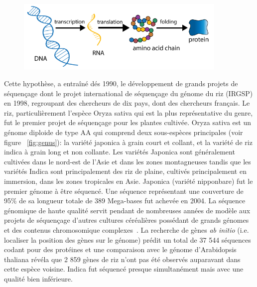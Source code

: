 \begin{figure}[!ht]
    \centering
    \includegraphics[width=0.90\textwidth]{hdr_manuscript/Figures/central-dogma.png}
    \label{fig:dogma}
\end{figure}



Cette hypothèse, a entraîné dés 1990, le développement de grands projets de séquençage dont le projet international de séquençage du génome du riz (IRGSP) en 1998, regroupant des chercheurs de dix pays, dont des chercheurs français. Le riz, particulièrement l'espèce Oryza sativa qui est la plus représentative du genre, fut le premier projet de séquençage pour les plantes cultivée. Oryza sativa est un génome diploide de type AA qui comprend deux sous-espèces principales (voir figure ~\ref{fig:genus}): la variété japonica à grain court et collant, et la variété de riz indica à grain long et non collante. Les variétés Japonica sont généralement cultivées dans le nord-est de l'Asie et dans les zones montagneuses tandis que les variétés Indica sont principalement des riz de plaine, cultivés principalement en immersion, dans les zones tropicales en Asie. Japonica (variété nipponbare) fut le premier génome à être séquencé. Une séquence représentant une couverture de 95\% de sa longueur totale de 389 Mega-bases fut achevée en 2004. La séquence génomique de haute qualité servit pendant de nombreuses années de modèle aux projets de séquençage d'autres cultures céréalières possédant de grands génomes et des contenus chromosomique complexes~\cite{matsumoto_nipponbare_2016}. La recherche de gènes  \textit{ab initio} (i.e. localiser la position des gènes sur le génome) prédit un total de 37 544 séquences codant pour des protéines et une comparaison avec le génome d'Arabidopsis thaliana révéla que 2 859 gènes de riz n'ont pas été observés auparavant dans cette espèce voisine. Indica fut séquencé presque simultanément mais avec une qualité bien inférieure.\\

